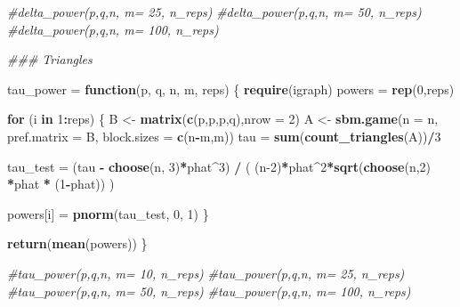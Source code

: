 \documentclass[
]{article}
\newenvironment{Shaded}{\begin{snugshade}}{\end{snugshade}}
\newcommand{\CommentTok}[1]{\textcolor[rgb]{0.56,0.35,0.01}{\textit{#1}}}
\newcommand{\ControlFlowTok}[1]{\textcolor[rgb]{0.13,0.29,0.53}{\textbf{#1}}}
\newcommand{\DataTypeTok}[1]{\textcolor[rgb]{0.13,0.29,0.53}{#1}}
\newcommand{\DecValTok}[1]{\textcolor[rgb]{0.00,0.00,0.81}{#1}}
\newcommand{\KeywordTok}[1]{\textcolor[rgb]{0.13,0.29,0.53}{\textbf{#1}}}
\newcommand{\NormalTok}[1]{#1}
\newcommand{\OperatorTok}[1]{\textcolor[rgb]{0.81,0.36,0.00}{\textbf{#1}}}
\newcommand{\StringTok}[1]{\textcolor[rgb]{0.31,0.60,0.02}{#1}}
\begin{document}
\begin{Shaded}
\begin{Highlighting}[]
\CommentTok{#delta_power(p,q,n, m= 25, n_reps)}
\CommentTok{#delta_power(p,q,n, m= 50, n_reps)}
\CommentTok{#delta_power(p,q,n, m= 100, n_reps)}


\CommentTok{### Triangles}

\NormalTok{tau_power =}\StringTok{ }\ControlFlowTok{function}\NormalTok{(p, q, n, m, reps)}
\NormalTok{\{}
  \KeywordTok{require}\NormalTok{(igraph)}
\NormalTok{  powers =}\StringTok{ }\KeywordTok{rep}\NormalTok{(}\DecValTok{0}\NormalTok{,reps)}
  

  \ControlFlowTok{for}\NormalTok{ (i }\ControlFlowTok{in} \DecValTok{1}\OperatorTok{:}\NormalTok{reps)}
\NormalTok{  \{}
\NormalTok{    B <-}\StringTok{ }\KeywordTok{matrix}\NormalTok{(}\KeywordTok{c}\NormalTok{(p,p,p,q),}\DataTypeTok{nrow =} \DecValTok{2}\NormalTok{)}
\NormalTok{    A <-}\StringTok{ }\KeywordTok{sbm.game}\NormalTok{(}\DataTypeTok{n =}\NormalTok{ n, }\DataTypeTok{pref.matrix =}\NormalTok{ B, }\DataTypeTok{block.sizes =} \KeywordTok{c}\NormalTok{(n}\OperatorTok{-}\NormalTok{m,m))}
\NormalTok{    tau =}\StringTok{ }\KeywordTok{sum}\NormalTok{(}\KeywordTok{count_triangles}\NormalTok{(A))}\OperatorTok{/}\DecValTok{3}
    
\NormalTok{    tau_test =}\StringTok{ }\NormalTok{(tau }\OperatorTok{-}\StringTok{ }\KeywordTok{choose}\NormalTok{(n, }\DecValTok{3}\NormalTok{)}\OperatorTok{*}\NormalTok{phat}\OperatorTok{^}\DecValTok{3}\NormalTok{) }\OperatorTok{/}\StringTok{ }\NormalTok{( (n}\DecValTok{-2}\NormalTok{)}\OperatorTok{*}\NormalTok{phat}\OperatorTok{^}\DecValTok{2}\OperatorTok{*}\KeywordTok{sqrt}\NormalTok{(}\KeywordTok{choose}\NormalTok{(n,}\DecValTok{2}\NormalTok{) }\OperatorTok{*}\NormalTok{phat }\OperatorTok{*}\StringTok{ }\NormalTok{(}\DecValTok{1}\OperatorTok{-}\NormalTok{phat)) )}

\NormalTok{    powers[i] =}\StringTok{ }\KeywordTok{pnorm}\NormalTok{(tau_test, }\DecValTok{0}\NormalTok{, }\DecValTok{1}\NormalTok{)}
\NormalTok{  \}}
  
  \KeywordTok{return}\NormalTok{(}\KeywordTok{mean}\NormalTok{(powers))}
\NormalTok{\}}

\CommentTok{#tau_power(p,q,n, m= 10, n_reps)}
\CommentTok{#tau_power(p,q,n, m= 25, n_reps)}
\CommentTok{#tau_power(p,q,n, m= 50, n_reps)}
\CommentTok{#tau_power(p,q,n, m= 100, n_reps)}
\end{Highlighting}
\end{Shaded}
\end{document}
